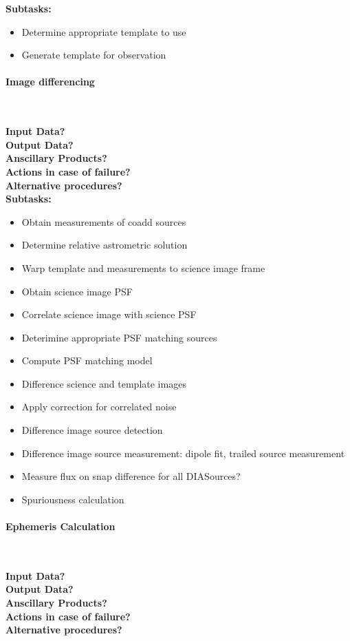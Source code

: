 \noindent
{\bf Subtasks:}
\begin{itemize}
\item Determine appropriate template to use
\item Generate template for observation
\end{itemize}

\paragraph{Image differencing}~

\noindent
{\bf Input Data?}\\
{\bf Output Data?}\\
{\bf Anscillary Products?}\\
{\bf Actions in case of failure?}\\
{\bf Alternative procedures?}\\

\noindent
{\bf Subtasks:}
\begin{itemize}
\item Obtain measurements of coadd sources
\item Determine relative astrometric solution
\item Warp template and measurements to science image frame
\item Obtain science image PSF
\item Correlate science image with science PSF
\item Deterimine appropriate PSF matching sources
\item Compute PSF matching model
\item Difference science and template images
\item Apply correction for correlated noise
\item Difference image source detection
\item Difference image source measurement: dipole fit, trailed source measurement
\item Measure flux on snap difference for all DIASources?
\item Spuriousness calculation
\end{itemize}

\paragraph{Ephemeris Calculation}~

\noindent
{\bf Input Data?}\\
{\bf Output Data?}\\
{\bf Anscillary Products?}\\
{\bf Actions in case of failure?}\\
{\bf Alternative procedures?}\\

